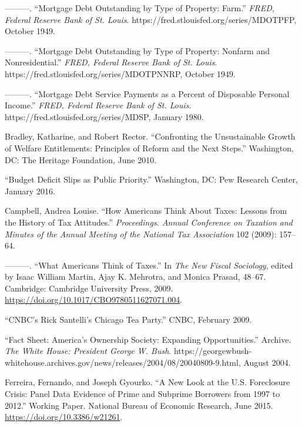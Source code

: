 \documentclass[
]{article}
\begin{document}
\leavevmode\hypertarget{ref-boardofgovernorsofthefederalreservesystemus1949mortgagea}{}%
---------. ``Mortgage Debt Outstanding by Type of Property: Farm.'' \emph{FRED, Federal Reserve Bank of St. Louis}. https://fred.stlouisfed.org/series/MDOTPFP, October 1949.

\leavevmode\hypertarget{ref-boardofgovernorsofthefederalreservesystemus1949mortgageb}{}%
---------. ``Mortgage Debt Outstanding by Type of Property: Nonfarm and Nonresidential.'' \emph{FRED, Federal Reserve Bank of St. Louis}. https://fred.stlouisfed.org/series/MDOTPNNRP, October 1949.

\leavevmode\hypertarget{ref-boardofgovernorsofthefederalreservesystemus1980mortgage}{}%
---------. ``Mortgage Debt Service Payments as a Percent of Disposable Personal Income.'' \emph{FRED, Federal Reserve Bank of St. Louis}. https://fred.stlouisfed.org/series/MDSP, January 1980.

\leavevmode\hypertarget{ref-bradley2010confronting}{}%
Bradley, Katharine, and Robert Rector. ``Confronting the Unsustainable Growth of Welfare Entitlements: Principles of Reform and the Next Steps.'' Washington, DC: The Heritage Foundation, June 2010.

\leavevmode\hypertarget{ref-2016budget}{}%
``Budget Deficit Slips as Public Priority.'' Washington, DC: Pew Research Center, January 2016.

\leavevmode\hypertarget{ref-campbell2009how}{}%
Campbell, Andrea Louise. ``How Americans Think About Taxes: Lessons from the History of Tax Attitudes.'' \emph{Proceedings. Annual Conference on Taxation and Minutes of the Annual Meeting of the National Tax Association} 102 (2009): 157--64.

\leavevmode\hypertarget{ref-campbell2009what}{}%
---------. ``What Americans Think of Taxes.'' In \emph{The New Fiscal Sociology}, edited by Isaac William Martin, Ajay K. Mehrotra, and Monica Prasad, 48--67. Cambridge: Cambridge University Press, 2009. \url{https://doi.org/10.1017/CBO9780511627071.004}.

\leavevmode\hypertarget{ref-santelli2009cnbc}{}%
``CNBC's Rick Santelli's Chicago Tea Party.'' CNBC, February 2009.

\leavevmode\hypertarget{ref-2004fact}{}%
``Fact Sheet: America's Ownership Society: Expanding Opportunities.'' Archive. \emph{The White House: President George W. Bush}. https://georgewbush-whitehouse.archives.gov/news/releases/2004/08/20040809-9.html, August 2004.

\leavevmode\hypertarget{ref-ferreira2015new}{}%
Ferreira, Fernando, and Joseph Gyourko. ``A New Look at the U.S. Foreclosure Crisis: Panel Data Evidence of Prime and Subprime Borrowers from 1997 to 2012.'' Working Paper. National Bureau of Economic Research, June 2015. \url{https://doi.org/10.3386/w21261}.
\end{document}
